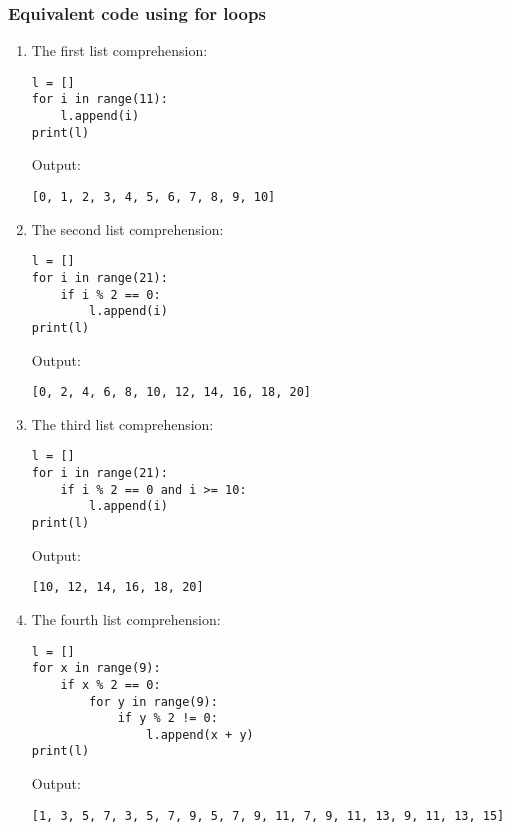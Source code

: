 \documentclass[11pt]{article}
\begin{document}
\subsubsection{Equivalent code using for loops}
\label{sec:orgc3f905f}
\begin{enumerate}
\item The first list comprehension:
\begin{verbatim}
l = []
for i in range(11):
    l.append(i)
print(l)
\end{verbatim}

 \noindent Output:

\begin{verbatim}
[0, 1, 2, 3, 4, 5, 6, 7, 8, 9, 10]
\end{verbatim}

\item The second list comprehension:
\begin{verbatim}
l = []
for i in range(21):
    if i % 2 == 0:
        l.append(i)
print(l)
\end{verbatim}

 \noindent Output:

\begin{verbatim}
[0, 2, 4, 6, 8, 10, 12, 14, 16, 18, 20]
\end{verbatim}

\item The third list comprehension:
\begin{verbatim}
l = []
for i in range(21):
    if i % 2 == 0 and i >= 10:
        l.append(i)
print(l)
\end{verbatim}

 \noindent Output:

\begin{verbatim}
[10, 12, 14, 16, 18, 20]
\end{verbatim}


 \newpage

\item The fourth list comprehension:
\begin{verbatim}
l = []
for x in range(9):
    if x % 2 == 0:
        for y in range(9):
            if y % 2 != 0:
                l.append(x + y)
print(l)
\end{verbatim}

 \noindent Output:

\begin{verbatim}
[1, 3, 5, 7, 3, 5, 7, 9, 5, 7, 9, 11, 7, 9, 11, 13, 9, 11, 13, 15]
\end{verbatim}
\end{enumerate}
\end{document}
